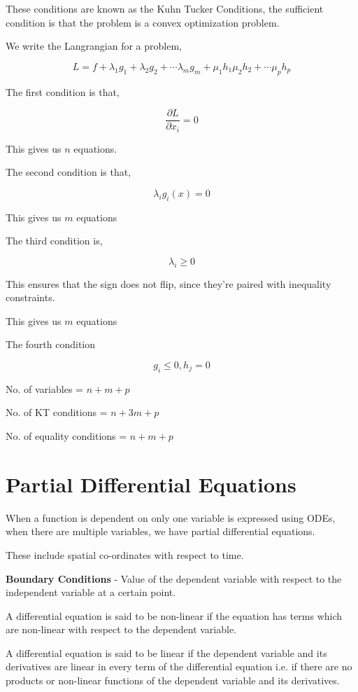 \documentclass[11pt]{report}
\begin{document}
These conditions are known as the Kuhn Tucker Conditions, the sufficient condition is that the problem is a convex optimization problem.

We write the Langrangian for a problem,

$$L = f + \lambda_{1} g_{1} + \lambda_2g_2 + \cdots \lambda_m g_m + \mu_1 h_1 \mu_2h_2 + \cdots \mu_p h_{p}$$


The first condition is that,

$$\frac{\partial L}{\partial x_i} = 0$$

This gives us \(n\) equations.

The second condition is that,

$$\lambda_i g_i(x) = 0$$

This gives us \(m\) equations

The third condition is,

$$\lambda_i \ge 0$$

This ensures that the sign does not flip, since they're paired with inequality constraints.

This gives us \(m\) equations

The fourth condition

$$g_i \le 0, h_j = 0$$

No. of variables = \(n+m+p\)

No. of KT conditions = \(n + 3m + p\)

No. of equality conditions = \(n + m + p\)
\part{Partial Differential Equations}
\label{sec:org1cc2e93}

When a function is dependent on only one variable is expressed using ODEs, when there are multiple variables, we have partial differential equations.

These include spatial co-ordinates with respect to time.

\textbf{Boundary Conditions} - Value of the dependent variable with respect to the independent variable at a certain point.

A differential equation is said to be non-linear if the equation has terms which are non-linear with respect to the dependent variable.


A differential equation is said to be linear if the dependent variable and its derivatives are linear in every term of the differential equation i.e. if there are no products or non-linear functions of the dependent variable and its derivatives.
\end{document}
